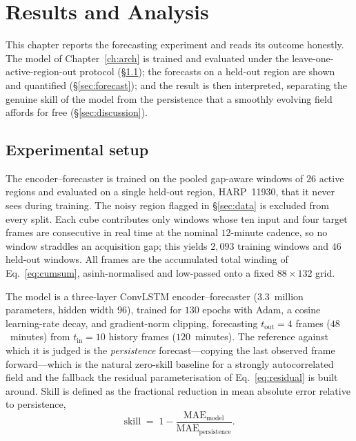 \chapter{Results and Analysis}
\label{ch:results}

This chapter reports the forecasting experiment and reads its outcome honestly.
The model of Chapter~\ref{ch:arch} is trained and evaluated under the
leave-one-active-region-out protocol (\S\ref{sec:setup}); the forecasts on a
held-out region are shown and quantified (\S\ref{sec:forecast}); and the result
is then interpreted, separating the genuine skill of the model from the
persistence that a smoothly evolving field affords for free
(\S\ref{sec:discussion}).

\section{Experimental setup}
\label{sec:setup}

The encoder--forecaster is trained on the pooled gap-aware windows of $26$
active regions and evaluated on a single held-out region, HARP~11930, that it
never sees during training. The noisy region flagged in \S\ref{sec:data} is
excluded from every split. Each cube contributes only windows whose ten input
and four target frames are consecutive in real time at the nominal $12$-minute
cadence, so no window straddles an acquisition gap; this yields $2{,}093$
training windows and $46$ held-out windows. All frames are the accumulated total
winding of Eq.~\eqref{eq:cumsum}, asinh-normalised and low-passed onto a fixed
$88\times132$ grid.

The model is a three-layer ConvLSTM encoder--forecaster ($3.3$~million
parameters, hidden width $96$), trained for $130$ epochs with Adam, a cosine
learning-rate decay, and gradient-norm clipping, forecasting $t_{\text{out}}=4$
frames ($48$~minutes) from $t_{\text{in}}=10$ history frames ($120$~minutes). The
reference against which it is judged is the \emph{persistence} forecast---copying
the last observed frame forward---which is the natural zero-skill baseline for a
strongly autocorrelated field and the fallback the residual parameterisation of
Eq.~\eqref{eq:residual} is built around. Skill is defined as the fractional
reduction in mean absolute error relative to persistence,
\begin{equation}
  \text{skill} \;=\; 1 - \frac{\mathrm{MAE}_{\text{model}}}{\mathrm{MAE}_{\text{persistence}}}.
  \label{eq:skill}
\end{equation}

